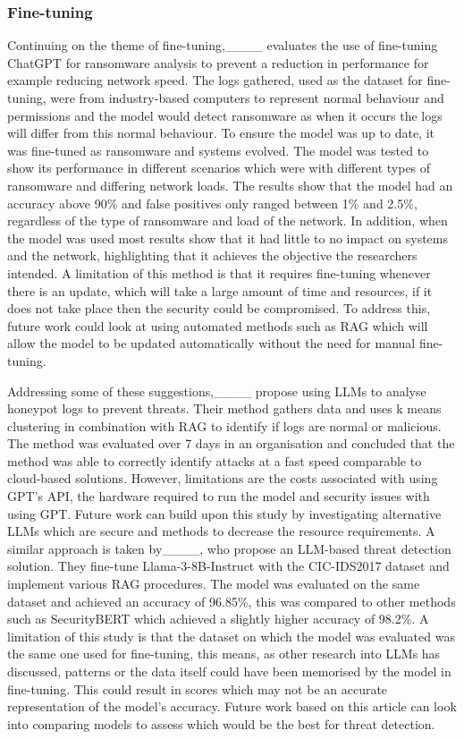 \subsubsection{Fine-tuning}
Continuing on the theme of fine-tuning,____ evaluates the use of fine-tuning ChatGPT for ransomware analysis to prevent a reduction in performance for example reducing network speed. The logs gathered, used as the dataset for fine-tuning, were from industry-based computers to represent normal behaviour and permissions and the model would detect ransomware as when it occurs the logs will differ from this normal behaviour. To ensure the model was up to date, it was fine-tuned as ransomware and systems evolved. The model was tested to show its performance in different scenarios which were with different types of ransomware and differing network loads. The results show that the model had an accuracy above 90\% and false positives only ranged between 1\% and 2.5\%, regardless of the type of ransomware and load of the network. In addition, when the model was used most results show that it had little to no impact on systems and the network, highlighting that it achieves the objective the researchers intended. A limitation of this method is that it requires fine-tuning whenever there is an update, which will take a large amount of time and resources, if it does not take place then the security could be compromised. To address this, future work could look at using automated methods such as RAG which will allow the model to be updated automatically without the need for manual fine-tuning. 

Addressing some of these suggestions,____ propose using LLMs to analyse honeypot logs to prevent threats. Their method gathers data and uses k means clustering in combination with RAG to identify if logs are normal or malicious. The method was evaluated over 7 days in an organisation and concluded that the method was able to correctly identify attacks at a fast speed comparable to cloud-based solutions. However, limitations are the costs associated with using GPT's API, the hardware required to run the model and security issues with using GPT. Future work can build upon this study by investigating alternative LLMs which are secure and methods to decrease the resource requirements. A similar approach is taken by____, who propose an LLM-based threat detection solution. They fine-tune Llama-3-8B-Instruct with the CIC-IDS2017 dataset and implement various RAG procedures. The model was evaluated on the same dataset and achieved an accuracy of 96.85\%, this was compared to other methods such as SecurityBERT which achieved a slightly higher accuracy of 98.2\%. A limitation of this study is that the dataset on which the model was evaluated was the same one used for fine-tuning, this means, as other research into LLMs has discussed, patterns or the data itself could have been memorised by the model in fine-tuning. This could result in scores which may not be an accurate representation of the model's accuracy. Future work based on this article can look into comparing models to assess which would be the best for threat detection.

